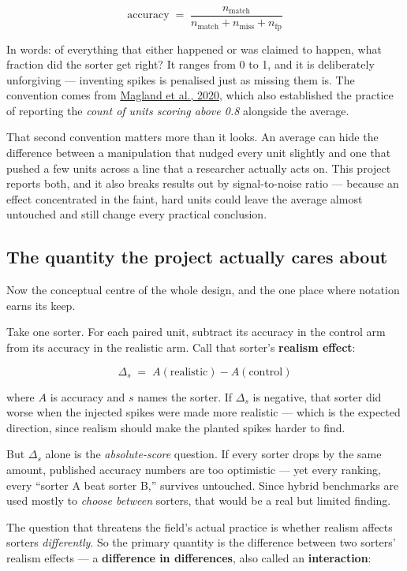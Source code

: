 \documentclass[12pt]{article}
\begin{document}
\[
\text{accuracy} \;=\; \frac{n_{\text{match}}}{n_{\text{match}} + n_{\text{miss}} + n_{\text{fp}}}
\]

In words: of everything that either happened or was claimed to happen, what fraction did the
sorter get right? It ranges from 0 to 1, and it is deliberately unforgiving --- inventing
spikes is penalised just as missing them is. The convention comes from
\href{https://doi.org/10.7554/eLife.55167}{Magland et al., 2020}, which also established the
practice of reporting the \emph{count of units scoring above 0.8} alongside the average.

That second convention matters more than it looks. An average can hide the difference between
a manipulation that nudged every unit slightly and one that pushed a few units across a line
that a researcher actually acts on. This project reports both, and it also breaks results out
by signal-to-noise ratio --- because an effect concentrated in the faint, hard units could
leave the average almost untouched and still change every practical conclusion.

\subsection{The quantity the project actually cares about}

Now the conceptual centre of the whole design, and the one place where notation earns its
keep.

Take one sorter. For each paired unit, subtract its accuracy in the control arm from its
accuracy in the realistic arm. Call that sorter's \textbf{realism effect}:

\[
\Delta_s \;=\; A(\text{realistic}) - A(\text{control})
\]

where $A$ is accuracy and $s$ names the sorter. If $\Delta_s$ is negative, that sorter did
worse when the injected spikes were made more realistic --- which is the expected direction,
since realism should make the planted spikes harder to find.

But $\Delta_s$ alone is the \emph{absolute-score} question. If every sorter drops by the same
amount, published accuracy numbers are too optimistic --- yet every ranking, every ``sorter A
beat sorter B,'' survives untouched. Since hybrid benchmarks are used mostly to \emph{choose
between} sorters, that would be a real but limited finding.

The question that threatens the field's actual practice is whether realism affects sorters
\emph{differently}. So the primary quantity is the difference between two sorters' realism
effects --- a \textbf{difference in differences}, also called an \textbf{interaction}:
\end{document}
